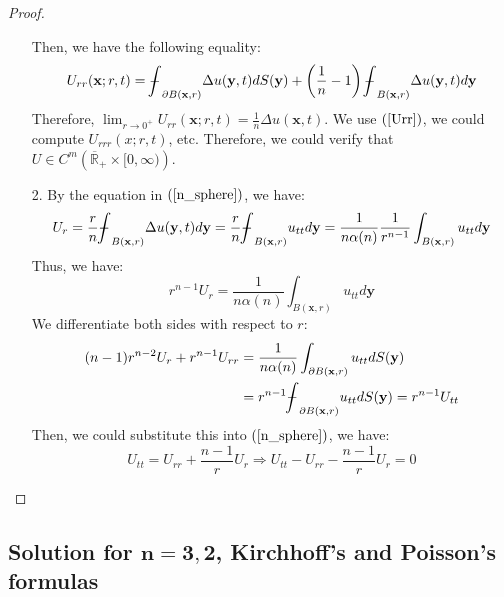 \documentclass[10pt]{article}
\def\vc{{\mathbf x}}
\newcommand\tbbint{{-\mkern -16mu\int}}
\newcommand\dbbint{{-\mkern -19mu\int}}
\newcommand\bbint{
{\mathchoice{\dbbint}{\tbbint}{\tbbint}{\tbbint}}
}
\begin{document}
\begin{proof}
\begin{itemize}
\begin{equation*}
        \end{equation*}
        Then, we have the following equality:
        \begin{equation}
            \label{Urr}
            U_{rr} (\vc; r,t) = \bbint_{\partial B(\vc,r)} \Delta u(\mathbf{y},t) d S(\mathbf{y}) + \left(\frac{1}{n}-1\right)\bbint_{B(\vc,r)} \Delta u(\mathbf{y},t) d \mathbf{y}
        \end{equation}
        Therefore, $\lim_{r \to 0^+} U_{rr}(\vc;r,t) = \frac{1}{n} \Delta u(\vc,t)$. We use $(\ref{Urr})$, we could compute $U_{rrr}(x;r,t)$, etc. Therefore, we could verify that $U\in C^{m}\left(\overline{\mathbb{R}}_{+} \times[0, \infty)\right)$.
        \item[2.] By the equation in $(\ref{n_sphere})$, we have:
        \begin{equation*}
            U_r = \frac{r}{n} \bbint_{B(\vc,r)} \Delta u(\mathbf{y},t) d \mathbf{y} = \frac{r}{n} \bbint_{B(\vc,r)} u_{tt} d\mathbf{y} = \frac{1}{n\alpha(n)} \frac{1}{r^{n-1}}\int_{B(\vc,r)} u_{tt} d\mathbf{y}
        \end{equation*}
        Thus, we have:
        \begin{equation*}
            r^{n-1} U_r = \frac{1}{n\alpha(n)} \int_{B(\vc,r)} u_{tt} d\mathbf{y}
        \end{equation*}
        We differentiate both sides with respect to $r$:
        \begin{align*}
            (n-1)r^{n-2} U_r + r^{n-1} U_{rr} &= \frac{1}{n\alpha(n)} \int_{\partial B(\vc,r)} u_{tt} dS(\mathbf{y}) \\
            &= r^{n-1} \bbint_{\partial B(\vc,r) } u_{tt} dS(\mathbf{y}) = r^{n-1} U_{tt}
        \end{align*}
        Then, we could substitute this into $(\ref{n_sphere})$, we have:
        \begin{equation}
            \label{Utt}
            U_{tt} = U_{rr} + \frac{n-1}{r} U_r \Rightarrow U_{tt} - U_{rr} - \frac{n-1}{r} U_r = 0
        \end{equation}
\end{itemize}
\end{proof}
\subsection{Solution for $\mathbf{n=3,2}$, Kirchhoff's and Poisson's formulas}
\end{document}
